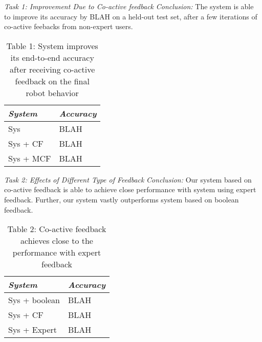 \noindent\textit{Task 1: Improvement Due to Co-active feedback}
\textit{Conclusion:} The system is able to improve its accuracy by BLAH on a held-out test set, after a few iterations of co-active feebacks from non-expert users.

\begin{table}
\label{tbl:tsk1}
\caption{Table 1: System improves its end-to-end accuracy after receiving co-active feedback on the final robot behavior}
\centering
\begin{tabular}{|l|l|}
\hline
\textit{System} & \textit{Accuracy} \\
\hline
Sys & BLAH \\
Sys + CF & BLAH \\
Sys + MCF & BLAH \\
\hline
\end{tabular}
\end{table}

\noindent\textit{Task 2: Effects of Different Type of Feedback}
\textit{Conclusion:} Our system based on co-active feedback is able to achieve close performance with system using expert feedback. Further, our system vastly outperforms system based on boolean feedback.

\begin{table}
\label{tbl:tsk2}
\caption{Table 2: Co-active feedback achieves close to the performance with expert feedback}
\centering
\begin{tabular}{|l|l|}
\hline
\textit{System} & \textit{Accuracy} \\
\hline
Sys + boolean & BLAH\\
Sys + CF & BLAH \\
Sys + Expert & BLAH \\
\hline
\end{tabular}
\end{table}


